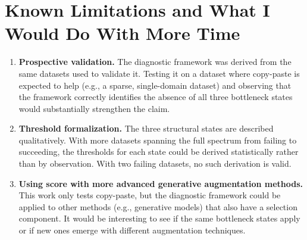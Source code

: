 \documentclass[10pt, a4paper]{article}
\begin{document}
\section{Known Limitations and What I Would Do With More Time}

\begin{enumerate}[nosep, leftmargin=*]
\item \textbf{Prospective validation.}
  The diagnostic framework was derived from the same datasets used to
  validate it.
  Testing it on a dataset where copy-paste is expected to help (e.g.,
  a sparse, single-domain dataset) and observing that the framework
  correctly identifies the absence of all three bottleneck states would
  substantially strengthen the claim.


\item \textbf{Threshold formalization.}
  The three structural states are described qualitatively.
  With more datasets spanning the full spectrum from failing to
  succeeding, the thresholds for each state could be derived
  statistically rather than by observation.
  With two failing datasets, no such derivation is valid.

\item \textbf{Using score with more advanced generative augmentation methods.}
  This work only tests copy-paste, but the diagnostic framework could
  be applied to other methods (e.g., generative models) that also have a
  selection component.
  It would be interesting to see if the same bottleneck states apply
  or if new ones emerge with different augmentation techniques.

\end{enumerate}
\end{document}
